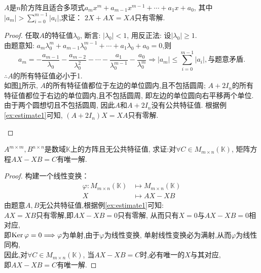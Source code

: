\begin{application}
  $A$是$n$阶方阵且适合多项式$a_mx^m+a_{m-1}x^{m-1}+\cdots+a_1x+a_0$,
  其中$|a_m| > \sum\limits^{m-1}_{i=0}|a_i|$,求证：
  $2X+AX=XA$只有零解.
\end{application}
\begin{proof}
  任取$A$的特征值$\lambda_0$, 断言: $|\lambda_0|<1$,
  用反正法: 设$|\lambda_0|\geq 1$.\\
  由题意知: 
  $a_m\lambda_0^m+a_{m-1}\lambda_0^{m-1}+\cdots+a_1\lambda_0+a_0=0$,则
  \begin{equation*}
  a_m=-\frac{a_{m-1}}{\lambda_0}-\frac{a_{m-2}}{\lambda_0^2}-\cdots-
  \frac{a_1}{\lambda_0^{m-1}}-\frac{a_0}{\lambda_0^m} \Longrightarrow
  |a_m| \leq \sum\limits^{m-1}_{i=0}|a_i|, \text{与题意矛盾}.
\end{equation*}
$\therefore A$的所有特征值必小于1.\\
如图\ref{fg:estimate1}所示,
$A$的所有特征值都位于左边的单位圆内,且不包括圆周;
$A+2I_n$的所有特征值都位于右边的单位圆内,且不包括圆周,
即左边的单位圆向右平移两个单位.
由于两个圆想切且不包括圆周,
因此$A$和$A+2I_n$没有公共特征值.
根据例\ref{ex:estimate1}可知,
$(A+2I_n)X=XA$只有零解.
\begin{figure}[!hb]
  \caption{}\label{fg:estimate1}
\end{figure}
\end{proof}
\begin{application}\label{ap:estimate1}
  $A^{m\times m},B^{n\times n}$是数域$\mathbb{K}$上的方阵且无公共特征值,
  求证:对$\forall C \in M_{m\times n}(\mathbb{K})$,
  矩阵方程$AX-XB=C$有唯一解.
\end{application}
\begin{proof}
  构建一个线性变换：
  \begin{align*}
    \varphi:M_{m\times n}(\mathbb{K}) & \mapsto M_{m\times n}(\mathbb{K})\\
     X & \mapsto AX-XB
  \end{align*}
  由题意$A,B$无公共特征值,根据例\ref{ex:estimate1}可知:\\
  $AX=XB$只有零解,即$AX-XB=0$只有零解,
  从而只有$X=0$与$AX-XB=0$相对应,\\
  即$\operatorname{Ker}\varphi=0 \Longrightarrow \varphi$为单射,由于$\varphi$为线性变换,
  单射线性变换必为满射,从而$\varphi$为线性同构,\\
  因此,对$\forall C \in M_{m\times n}(\mathbb{K})$,
  当$AX-XB=C$时,必有唯一的$X$与其对应,\\
  即$AX-XB=C$有唯一解.
\end{proof}
